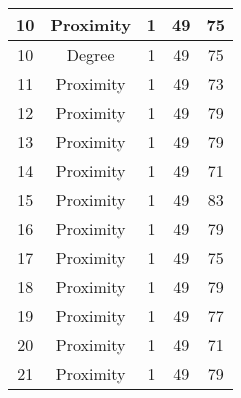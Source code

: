 \documentclass[results.tex]{subfiles}
\begin{document}
\begin{center}
\begin{tabular}{| c || c | c | c | c |}
            \hline
            10                      & Proximity                    & 1                      & 49                      & 75                   \\
            \hline
            10                      & Degree                       & 1                      & 49                      & 75                   \\
            \hline
            11                      & Proximity                    & 1                      & 49                      & 73                   \\
            \hline
            12                      & Proximity                    & 1                      & 49                      & 79                   \\
            \hline
            13                      & Proximity                    & 1                      & 49                      & 79                   \\
            \hline
            14                      & Proximity                    & 1                      & 49                      & 71                   \\
            \hline
            15                      & Proximity                    & 1                      & 49                      & 83                   \\
            \hline
            16                      & Proximity                    & 1                      & 49                      & 79                   \\
            \hline
            17                      & Proximity                    & 1                      & 49                      & 75                   \\
            \hline
            18                      & Proximity                    & 1                      & 49                      & 79                   \\
            \hline
            19                      & Proximity                    & 1                      & 49                      & 77                   \\
            \hline
            20                      & Proximity                    & 1                      & 49                      & 71                   \\
            \hline
            21                      & Proximity                    & 1                      & 49                      & 79                   \\

\end{tabular}
\end{center}
\end{document}
